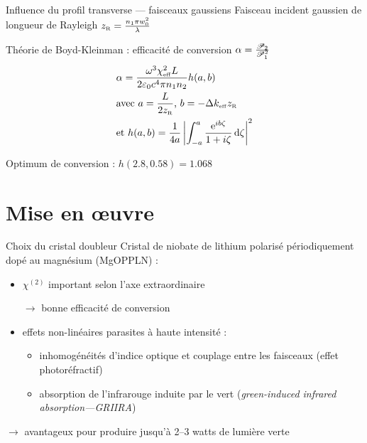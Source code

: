\documentclass{beamer}
\newcommand{\zr}{z_\mathsc{R}}
\newcommand{\chie}{\chi_\mathsc{eff}}
\begin{document}
\begin{frame}{Influence du profil transverse --- faisceaux gaussiens}
Faisceau incident gaussien de longueur de Rayleigh $\zr = \frac{n_1\pi w_0^2}{\lambda}$

Théorie de Boyd-Kleinman : efficacité de conversion $\alpha = \frac{\P_2}{\P_1^2}$
\begin{align*}
&\alpha = \frac{\omega^3 \chie^2 L}{2 \varepsilon_0 c^4 \pi n_1 n_2} h(a,b) \\
	&\text{avec } a=\frac{L}{2z_{\mathsc R}}\text{, } b=- \Delta k_\mathsc{eff} z_\mathsc{R} \\
	&\text{et } h(a,b)=\frac{1}{4a} \left|\int_{-a}^{a} \frac{\e{ib\zeta}}{1+i\zeta} \diff \zeta \right|^2
\end{align*}
\end{frame}

\begin{frame}{Optimum de conversion : $h(2.8,0.58)=1.068$}
\centering

\end{frame}

\section{Mise en \oe uvre}

\begin{frame}{Choix du cristal doubleur}
Cristal de niobate de lithium polarisé périodiquement dopé au magnésium (MgO\hc PPLN) :
\begin{itemize}
\item $\chi^{(2)}$ important selon l'axe extraordinaire
\item[$\rightarrow$] bonne efficacité de conversion
\item effets non-linéaires parasites à haute intensité :
\begin{itemize}
\item inhomogénéités d'indice optique et couplage entre les faisceaux (effet photoréfractif)
\item absorption de l'infrarouge induite par le vert (\textit{green-induced infrared absorption---GRIIRA})
\end{itemize}
\end{itemize}
$\boldsymbol\rightarrow$ avantageux pour produire jusqu'à 2--3 watts de lumière verte
\end{frame}
\end{document}
